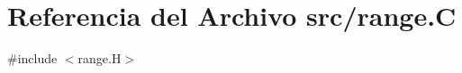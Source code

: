 \hypertarget{range_8_c}{}\section{Referencia del Archivo src/range.C}
\label{range_8_c}
{\ttfamily \#include $<$range.\+H$>$}\newline
